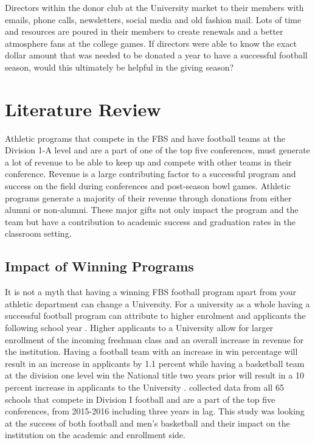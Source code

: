 \documentclass[12pt,english]{article}
\begin{document}
Directors within the donor club at the University market to their members with emails, phone calls, newsletters, social media and old fashion mail. Lots of time and resources are poured in their members to create renewals and a better atmosphere fans at the college games. If directors were able to know the exact dollar amount that was needed to be donated a year to have a successful football season, would this ultimately  be helpful in the giving season? 


\section{Literature Review}\label{sec:litreview}
Athletic programs that compete in the FBS and have football teams at the Division 1-A level and are a part of one of the top five conferences, must generate a lot of revenue to be able to keep up and compete with other teams in their conference. Revenue is a large contributing factor to a successful program and success on the field during conferences and post-season bowl games. Athletic programs generate a majority of their revenue through donations from either alumni or non-alumni. These major gifts not only impact the program and the team but have a contribution to academic success and graduation rates in the classroom setting. 
\subsection{Impact of Winning Programs}
It is not a myth that having a winning FBS football program apart from your athletic department can change a University. For a university as a whole having a successful football program can attribute to higher enrolment and applicants the following school year \citep{Baumer}. Higher applicants to a University allow for larger enrollment of the incoming freshman class and an overall increase in revenue for the institution. Having a football team with an increase in win percentage will result in an increase in applicants by 1.1 percent while having a basketball team at the division one level win the National title two years prior will result in a 10 percent increase in applicants to the University \citep{Baumer}. \citet{Baumer} collected data from all 65 schools that compete in Division I football and are a part of the top five conferences, from 2015-2016 including three years in lag. This study was looking at the success of both football and men’s basketball and their impact on the institution on the academic and enrollment side.
\end{document}
